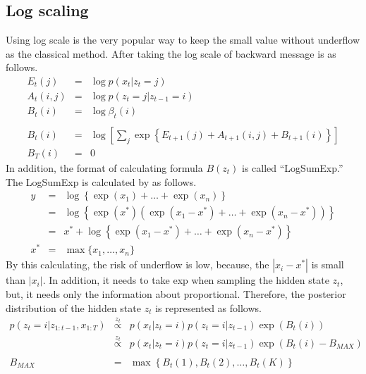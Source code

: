 \documentclass[a4paper]{article}
\newcommand{\proptoas}[1]{\overset{#1}{\propto}}
\begin{document}
	\subsection{Log scaling}
	Using log scale is the very popular way to keep the small value without underflow as the classical method.
	After taking the log scale of backward message is as follows.
	\begin{eqnarray}
		E_{t}(j) &=& \log{p(x_{t} | z_{t} = j)}\\
		A_{t}(i, j) &=& \log{p(z_t = j | z_{t-1} = i)}\\
		B_t(i) &=& \log{\beta_t(i)}\\
		\nonumber \\
		B_t(i) &=& \log{\left[\sum_{j}{\exp{ \left\{ E_{t+1}(j) + A_{t+1}(i, j) + B_{t+1}(i) \right\}}}\right]} \\
		B_T(i) &=& 0
	\end{eqnarray}
	In addition, the format of calculating formula $B(z_t)$ is called ``LogSumExp.''
	The LogSumExp is calculated by as follows.
	\begin{eqnarray}
		y &=& \log{\left\{ \exp{(x_1)} + \ldots + \exp{(x_n)} \right\}} \\
		&=& \log{\left\{ \exp{(x^*)} \left( \exp{(x_1 - x^*)} + \ldots + \exp{(x_n - x^*)} \right)\right\}} \\
		&=& x^* + \log{\left\{ \exp{(x_1 - x^*)} + \ldots + \exp{(x_n - x^*)} \right\}} \\
		x^* &=& \max{\{ x_1, \ldots, x_n \}}
	\end{eqnarray}
	By this calculating, the risk of underflow is low, because, the $|x_i - x^*|$ is small than $|x_i|$.
	In addition, it needs to take exp when sampling the hidden state $z_t$, but, it needs only the information about proportional.
	Therefore, the posterior distribution of the hidden state $z_t$ is represented as follows.
	\begin{eqnarray}
		p(z_{t} = i | z_{1:t-1}, x_{1:T})
		&\proptoas{z_t}&
		p(x_t | z_t = i) p(z_t = i | z_{t-1}) \exp{\left(B_t(i)\right)} \\
		&\proptoas{z_t}&
		p(x_t | z_t = i) p(z_t = i | z_{t-1}) \exp{\left(B_t(i) - B_{MAX}\right)} \\
		\nonumber \\
		B_{MAX} &=& \max{\left\{ B_t(1), B_t(2), \ldots, B_t(K)\right\}}
	\end{eqnarray}
\end{document}
